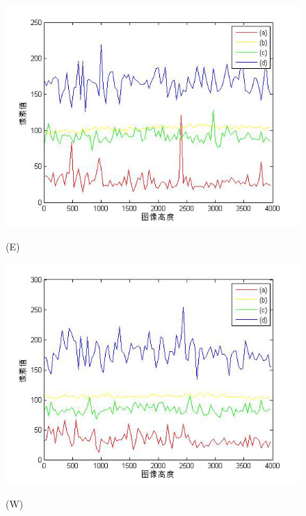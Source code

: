 \begin{figure}[htbp]

\begin{minipage}{0.48\linewidth}
\centerline{\includegraphics[width=1\linewidth]{figures/guangxianshuaijianduibitushuipinge.png}}
\centerline{(E)}
\end{minipage}
\begin{minipage}{0.48\linewidth}
\centerline{\includegraphics[width=1\linewidth]{figures/guangxianshuaijianduibitushuipingw.png}}
\centerline{(W)}
\end{minipage}



\end{figure}
